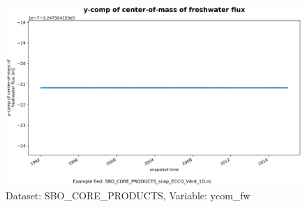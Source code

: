 \begin{figure}[H]
\centering
\includegraphics[scale=0.55]{../images/plots/oneD_plots/SBO_Core_Products/ycom_fw.png}
\caption{Dataset: SBO\_CORE\_PRODUCTS, Variable: ycom\_fw}
\label{tab:table-SBO_CORE_PRODUCTS_ycom_fw-Plot}
\end{figure}
\pagebreak
